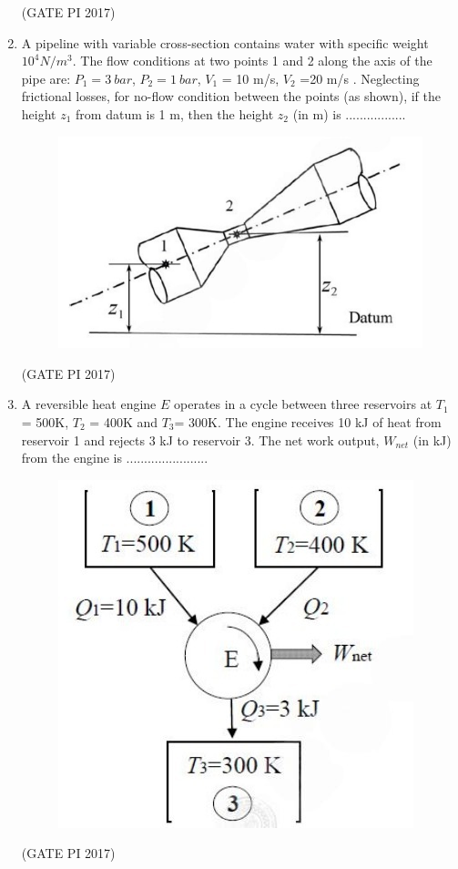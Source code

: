 \documentclass[journal,12pt,onecolumn]{IEEEtran}
\theoremstyle{remark}
\begin{document}
\begin{enumerate}
\hfill (GATE PI 2017)

\item A pipeline with variable cross\--section contains water with specific weight $10^4 N/m^3$.  
The flow conditions at two points 1 and 2 along the axis of the pipe are:  
$P_1 = 3\ bar$, $P_2 = 1\ bar$, $V_1$ = 10 m/s, $V_2$ =20 m/s .  
Neglecting frictional losses, for no\--flow condition between the points (as shown), if the height $z_1$ from datum is 1 m,  
then the height $z_2$ (in m) is .................

\begin{figure}[h]
    \centering
    \includegraphics[width=0.4\linewidth]{fig7.png}
    \caption{}
    \label{fig:placeholder}
\end{figure}


\hfill (GATE PI 2017)

\item A reversible heat engine $E$ operates in a cycle between three reservoirs at  
$T_{1}$ = 500K, $T_{2}$ = 400K and $T_{3} $= 300K.  
The engine receives 10 kJ of heat from reservoir 1 and rejects 3 kJ to reservoir 3.  
The net work output, $W_{{net}}$ (in kJ) from the engine is ....................... \\

\begin{figure}[h]
    \centering
    \includegraphics[width=0.5\linewidth]{fig8.png}
    \caption{}
    \label{fig:placeholder}
\end{figure}

\hfill (GATE PI 2017)


\end{enumerate}
\end{document}
